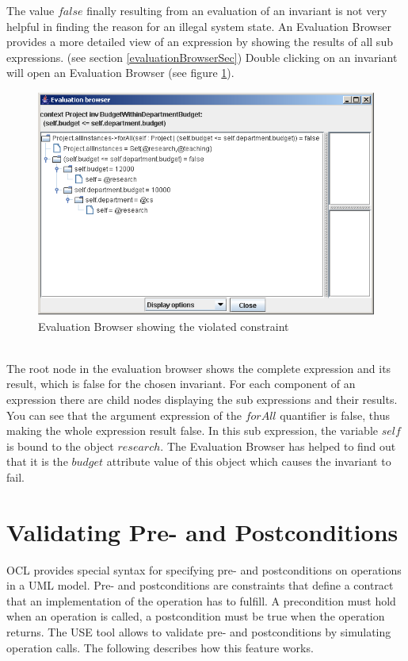 \documentclass[a4paper,titlepage,oneside,final]{scrreprt} %
\begin{document}
The value $\mathit{false}$ finally resulting from an evaluation of an
invariant is not very helpful in finding the reason for an illegal
system state. An Evaluation Browser provides a more detailed view of
an expression by showing the results of all sub expressions. (see section \ref{evaluationBrowserSec})
Double clicking
on an invariant will open an Evaluation Browser (see figure \ref{fig:EvalBrowserDemo}).
\begin{figure}[ht]
\centering
\includegraphics[scale=0.7]{Screenshots/GUI/EvalBrowserDemo.png}
\caption{Evaluation Browser showing the violated constraint}
\label{fig:EvalBrowserDemo}
\end{figure}\\
The root node in the evaluation browser shows the complete
expression and its result, which is false for the chosen invariant.
For each component of an expression there are child nodes displaying
the sub expressions and their results. You can see that the argument
expression of the $\mathit{forAll}$ quantifier is false, thus making the whole expression
result false. In this sub expression, the variable $\mathit{self}$ is bound to the object
$\mathit{research}$. The Evaluation Browser has helped to find out that it is the $\mathit{budget}$
attribute value of this object which causes the invariant to fail.
\section{Validating Pre- and Postconditions}
OCL provides special syntax for specifying pre- and postconditions
on operations in a UML model. Pre- and postconditions are constraints
that define a contract that an implementation of the operation has to fulfill.
A precondition must hold when an operation is called, a postcondition must be
true when the operation returns. The USE tool allows to validate pre- and postconditions
by simulating operation calls. The following describes how this feature works.
\end{document}
